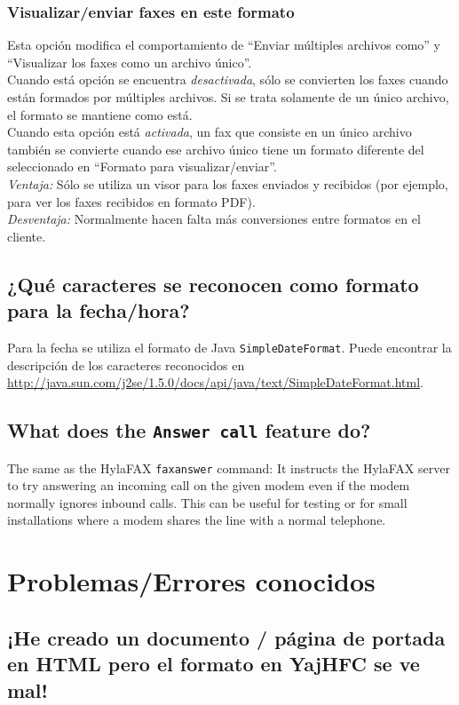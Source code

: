 \documentclass[a4paper,10pt]{scrartcl}
\begin{document}
\subsubsection{Visualizar/enviar faxes en este formato}
Esta opción modifica el comportamiento de ``Enviar múltiples archivos como'' y ``Visualizar los faxes como un archivo único''.\\
Cuando está opción se encuentra \textit{desactivada}, sólo se convierten los faxes cuando están formados por múltiples archivos. Si se trata solamente de un único archivo, el formato se mantiene como está.\\
Cuando esta opción está \textit{activada}, un fax que consiste en un único archivo también se convierte cuando ese archivo único tiene un formato diferente del seleccionado en ``Formato para visualizar/enviar''.\\
\textit{Ventaja:} Sólo se utiliza un visor para los faxes enviados y recibidos (por ejemplo, para ver los faxes recibidos en formato PDF).\\
\textit{Desventaja:} Normalmente hacen falta más conversiones entre formatos en el cliente.

\subsection{¿Qué caracteres se reconocen como formato para la fecha/hora?}

Para la fecha se utiliza el formato de Java \texttt{SimpleDateFormat}. Puede encontrar la descripción de los caracteres reconocidos en \url{http://java.sun.com/j2se/1.5.0/docs/api/java/text/SimpleDateFormat.html}.

\subsection{What does the \texttt{Answer call} feature do?}

The same as the HylaFAX \verb#faxanswer# command: It instructs the HylaFAX server to try answering an incoming call on the given modem even if the modem normally ignores inbound calls. This can be useful for testing or for small installations where a modem shares the line with a normal telephone.

\section{Problemas/Errores conocidos}

\subsection{¡He creado un documento / página de portada en HTML pero el formato en YajHFC se ve mal!}
\end{document}
